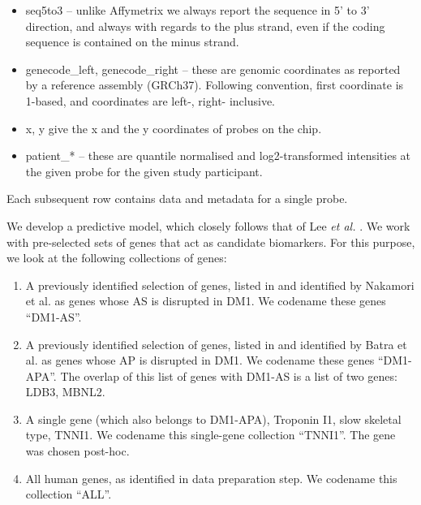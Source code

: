 \documentclass[10pt,letterpaper]{article}
\begin{document}
\begin{itemize}

\item seq5to3 – unlike Affymetrix we always report the sequence in 5' to 3' direction, and always with regards to the plus strand, even if the coding sequence is contained on the minus strand.
\item genecode\_left, genecode\_right – these are genomic coordinates as reported by a reference assembly (GRCh37). Following convention, first coordinate is 1-based, and coordinates are left-, right- inclusive.
\item x, y give the x and the y coordinates of probes on the chip.
\item patient\_* – these are quantile normalised and log2-transformed intensities at the given probe for the given study participant.

\end{itemize}

Each subsequent row contains data and metadata for a single probe.

We develop a predictive model, which closely follows that of Lee {\it et al.} \cite{Lee2013}. We work with pre-selected sets of genes that act as candidate biomarkers. For this purpose, we look at the following collections of genes:
        
\begin{enumerate}

\item A previously identified selection of genes, listed in  and identified by Nakamori et al. \cite{Nakamori2013} as genes whose AS is disrupted in DM1. We codename these genes ``DM1-AS''.

\item A previously identified selection of genes, listed in  and identified by Batra et al. \cite{Batra2014} as genes whose AP is disrupted in DM1. We codename these genes ``DM1-APA''. The overlap of this list of genes with DM1-AS is a list of two genes: LDB3, MBNL2.

\item A single gene (which also belongs to DM1-APA), Troponin I1, slow skeletal type, TNNI1. We codename this single-gene collection ``TNNI1''. The gene was chosen post-hoc.

\item All human genes, as identified in data preparation step. We codename this collection ``ALL''.
\end{enumerate}
\end{document}
